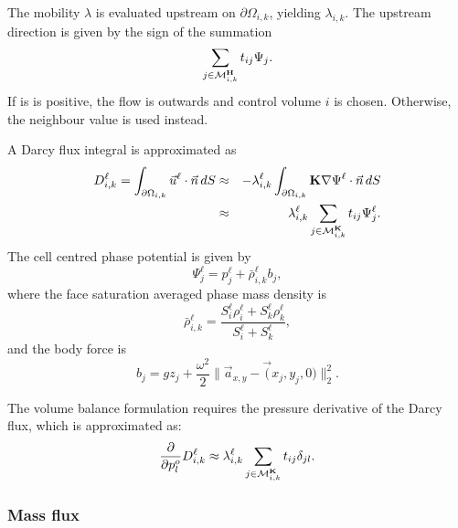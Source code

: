 The mobility $\lambda$ is evaluated upstream on
$\partial\Omega_{i,k}$, yielding $\lambda_{i,k}$. The upstream
direction is given by the sign of the summation
\begin{equation}
  \sum_{j\in\mathcal{M}_{i,k}^{\textbf H}} t_{ij} \Psi_j.
\end{equation}
If is is positive, the flow is outwards and control volume $i$ is
chosen. Otherwise, the neighbour value is used instead.



A Darcy flux integral is approximated as
\begin{eqnarray}
  D_{i,k}^\ell = \int_{\partial\Omega_{i,k}} \vec u^\ell\cdot\vec n\, dS
  & \approx &
  - \lambda_{i,k}^\ell\int_{\partial\Omega_{i,k}}
  {\textbf K}\nabla\Psi^\ell\cdot\vec n\, dS \\
  & \approx &
  \lambda_{i,k}^\ell
  \sum_{j\in\mathcal{M}_{i,k}^{\textbf K}} t_{ij} \Psi_j^\ell.
\end{eqnarray}
The cell centred phase potential is given by
\begin{equation}
  \Psi_j^\ell = p_j^\ell + \bar\rho^\ell_{i,k} b_j,
\end{equation}
where the face saturation averaged phase mass density is
\begin{equation}
  \bar\rho^\ell_{i,k} =
  \frac{S_i^\ell \rho_i^\ell + S_k^\ell \rho_k^\ell}{S_i^\ell + S_k^\ell},
\end{equation}
and the body force is
\begin{equation}
	b_j = g z_j + \frac{\omega^2}{2}
   \|\vec a_{x,y} - \vec (x_j,y_j,0)\|_2^2.
\end{equation}

The volume balance formulation requires the pressure derivative of the
Darcy flux, which is approximated as:
\begin{equation}
  \frac{\partial}{\partial p_l^o} D_{i,k}^\ell \approx
  \lambda_{i,k}^\ell
  \sum_{j\in\mathcal{M}_{i,k}^{\textbf K}} t_{ij} \delta_{jl}.
\end{equation}


\subsubsection{Mass flux}

